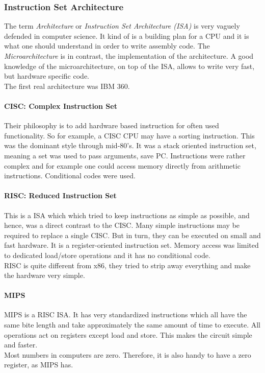 

\subsubsection{Instruction Set Architecture}
The term \textit{Architecture} or \textit{Instruction Set Architecture (ISA)} is very vaguely defended in computer science. It kind of is a building plan for a CPU and it is what one should understand in order to write assembly code. The \textit{Microarchitecture} is in contrast, the implementation of the architecture. A good knowledge of the microarchitecture, on top of the ISA, allows to write very fast, but hardware specific code.\\
The first real architecture was IBM 360. 

\paragraph{CISC: Complex Instruction Set}
Their philosophy is to add hardware based instruction for often used functionality. So for example, a CISC CPU may have a sorting instruction. This was the dominant style through mid-80's. It was a stack oriented instruction set, meaning a set was used to pass arguments, save PC. Instructions were rather complex and for example one could access memory directly from arithmetic instructions. Conditional codes were used.

\paragraph{RISC: Reduced Instruction Set}
This is a ISA which which tried to keep instructions as simple as possible, and hence, was a direct contrast to the CISC. Many simple instructions may be required to replace a single CISC. But in turn, they can be executed on small and fast hardware. It is a register-oriented instruction set. Memory access was limited to dedicated load/store operations and it has no conditional code.\\
RISC is quite different from x86, they tried to strip away everything and make the hardware very simple.

\paragraph{MIPS}
MIPS is a RISC ISA. It has very standardized instructions which all have the same bite length and take approximately the same amount of time to execute. All operations act on registers except load and store. This makes the circuit simple and faster.\\
Most numbers in computers are zero. Therefore, it is also handy to have a zero register, as MIPS has.

